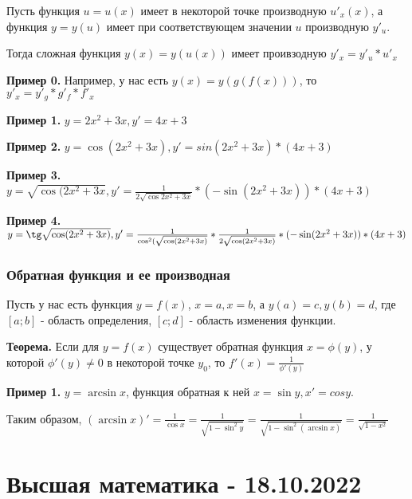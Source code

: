 \documentclass{article}
\begin{document}
\begin{flushleft}
Пусть функция $u = u(x)$ имеет в некоторой точке производную $u'_x(x)$, а функция $y = y(u)$ имеет при соответствующем значении $u$ производную $y'_u$.

Тогда сложная функция $y(x) = y(u(x))$ имеет проивзодную $y'_x = y'_u * u'_x$

\hfill

\textbf{Пример 0.} Например, у нас есть $y(x) = y(g(f(x)))$, то $y'_x = y'_g * g'_f * f'_x$

\hfill

\textbf{Пример 1.} $y = 2x^2 + 3x, y' = 4x + 3$

\hfill

\textbf{Пример 2.} $y = \cos (2x^2 + 3x), y' = sin (2x^2 + 3x) * (4x + 3)$

\hfill

\textbf{Пример 3.} $y = \sqrt{\cos{(2x^2 + 3x}}, y' = \frac{1}{2\sqrt{\cos{2x^2 + 3x}}} * (-\sin (2x^2 + 3x)) * (4x + 3)$

\hfill

\textbf{Пример 4.} $y = \tg \sqrt{\cos (2x^2 + 3x)}, y' = \frac{1}{\cos^2 (\sqrt{\cos (2x^2 + 3x)}} * \frac{1}{2 \sqrt{\cos (2x^2 + 3x)}} * (-\sin (2x^2 + 3x)) * (4x + 3)$

\subsubsection{Обратная функция и ее производная}

Пусть у нас есть функция $y = f(x)$, $x = a, x = b$, а $y(a) = c, y(b) = d$, где $[a; b]$ - область определения,  $[c; d]$ - область изменения функции.

\hfill

\textbf{Теорема.} Если для $y = f(x)$ существует обратная функция $x = \phi (y)$, у которой $\phi'(y) \ne 0$ в некоторой точке $y_0$, то $f'(x) = \frac{1}{\phi'(y)}$

\hfill

\textbf{Пример 1.} $y = \arcsin x$, функция обратная к ней $x = \sin y, x' = cos y$.

Таким образом, $(\arcsin x)' = \frac{1}{\cos x} = \frac{1}{\sqrt{1 - \sin^2 y}} = \frac{1}{\sqrt{1 - \sin^2(\arcsin x)}} = \frac{1}{\sqrt{1 - x^2}}$

\end{flushleft}

\pagebreak
\section{Высшая математика - 18.10.2022}
\end{document}
